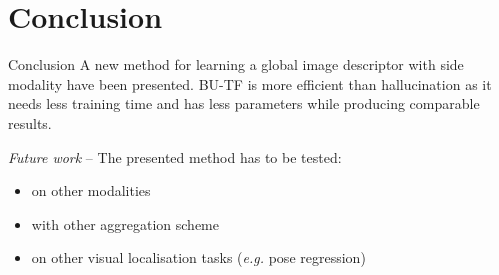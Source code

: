 \section{Conclusion}

\label{subsec:conlusion}

\begin{frame}{Conclusion}
	\vfill
	A new method for learning a global image descriptor with side modality have been presented. BU-TF is more efficient than hallucination as it needs less training time and has less parameters while producing comparable results.
	\vfill
	\uncover<2->
	{


		\textit{Future work} -- The presented method has to be tested:
		\begin{itemize}
			\item<2-> on other modalities
			\item<3-> with other aggregation scheme
			\item<4-> on other visual localisation tasks (\textit{e.g.} pose regression)
		\end{itemize}
	}	
\end{frame}

